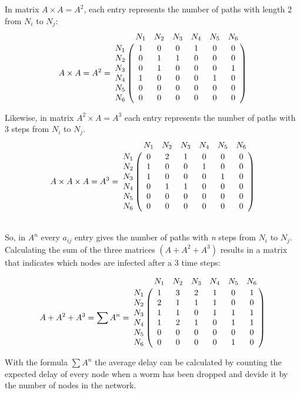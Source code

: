 In matrix $A \times A = A^{2}$, each entry represents the number of  paths with length 2 from $N_{i}$ to $N_{j}$:\\


\begin{equation}
 A \times A = A^{2} =
\bordermatrix{
         & N_1		& N_2	& N_3	& N_4 	& N_5	&N_6     \cr
    N_1   & 1		& 0		& 0		& 1		& 0		& 0	     \cr
    N_2   & 0		& 1		& 1		& 0		& 0		& 0	     \cr
    N_3   & 0		& 1		& 0		& 0		& 0		& 1 	     \cr
    N_4   & 1	    & 0		& 0		& 0		& 1		& 0	     \cr
	N_5   & 0		& 0		& 0		& 0		& 0		& 0	     \cr
	N_6   & 0		& 0		& 0		& 0		& 0		& 0	     \cr
}
\end{equation}

Likewise, in matrix $A^{2} \times A = A^{3}$ each entry represents the number of paths with 3 steps from $N_{i}$ to $N_{j}$.\\


\begin{equation}
 A \times A \times A = A^{3} =
\bordermatrix{
         & N_1		& N_2	& N_3	& N_4 	& N_5	&N_6     \cr
    N_1   & 0		& 2		& 1		& 0		& 0		& 0	     \cr
    N_2   & 1		& 0		& 0		& 1		& 0		& 0	     \cr
    N_3   & 1		& 0		& 0		& 0		& 1		& 0	     \cr
    N_4   & 0		& 1		& 1		& 0		& 0		& 0	     \cr
	N_5   & 0		& 0		& 0		& 0		& 0		& 0	     \cr
	N_6   & 0		& 0		& 0		& 0		& 0		& 0	     \cr
}
\end{equation}


~~\\
So, in $A^{n}$ every $a_{ij}$ entry gives the number of paths with \textit{n} steps from $N_{i}$ to $N_{j}$.\\

Calculating the sum of the three matrices $(A + A^{2} + A^{3}) $ results in a matrix that indicates which nodes are infected after a 3 time steps:

\begin{equation}
 A + A^{2} + A^{3} = \sum A^{n} =
\bordermatrix{
         & N_1		& N_2	& N_3	& N_4 	& N_5	&N_6     \cr
    N_1   & 1		& 3		& 2		& 1		& 0		& 1	     \cr
    N_2   & 2		& 1		& 1		& 1		& 0		& 0	     \cr
    N_3   & 1		& 1		& 0		& 1		& 1		& 1	     \cr
    N_4   & 1		& 2		& 1		& 0		& 1		& 1	     \cr
	N_5   & 0		& 0		& 0		& 0		& 0		& 0	     \cr
	N_6   & 0		& 0		& 0		& 0		& 1		& 0	     \cr
}
\end{equation}

With the formula $\sum A^{n}$ the average delay can be calculated by counting the expected delay of every node when a worm has been dropped and devide it by the number of nodes in the network. \\

